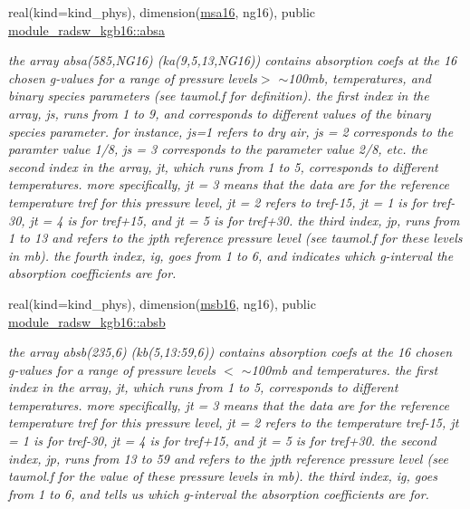 \begin{DoxyCompactItemize}
\mbox{\label{group__module__radsw__kgbnn_ga51fe40b5f24cc461850fe5be40d18869}} 
real(kind=kind\+\_\+phys), dimension(\hyperlink{namespacemodule__radsw__kgb16_ad76a9d79e77228ac93ec3db96eed2b29}{msa16}, ng16), public \hyperlink{group__module__radsw__kgbnn_ga51fe40b5f24cc461850fe5be40d18869}{module\+\_\+radsw\+\_\+kgb16\+::absa}
\begin{DoxyCompactList}\small\item\em the array absa(585,\+N\+G16) (ka(9,5,13,\+N\+G16)) contains absorption coefs at the 16 chosen g-\/values for a range of pressure levels$>$ $\sim$100mb, temperatures, and binary species parameters (see taumol.\+f for definition). the first index in the array, js, runs from 1 to 9, and corresponds to different values of the binary species parameter. for instance, js=1 refers to dry air, js = 2 corresponds to the paramter value 1/8, js = 3 corresponds to the parameter value 2/8, etc. the second index in the array, jt, which runs from 1 to 5, corresponds to different temperatures. more specifically, jt = 3 means that the data are for the reference temperature tref for this pressure level, jt = 2 refers to tref-\/15, jt = 1 is for tref-\/30, jt = 4 is for tref+15, and jt = 5 is for tref+30. the third index, jp, runs from 1 to 13 and refers to the jpth reference pressure level (see taumol.\+f for these levels in mb). the fourth index, ig, goes from 1 to 6, and indicates which g-\/interval the absorption coefficients are for. \end{DoxyCompactList}\item 
\mbox{\label{group__module__radsw__kgbnn_gafe8639128e4f7a48f133b7399addcb79}} 
real(kind=kind\+\_\+phys), dimension(\hyperlink{group__module__radsw__kgbnn_ga2ce1ab36897fb1fc7d85cbf7fe539e59}{msb16}, ng16), public \hyperlink{group__module__radsw__kgbnn_gafe8639128e4f7a48f133b7399addcb79}{module\+\_\+radsw\+\_\+kgb16\+::absb}
\begin{DoxyCompactList}\small\item\em the array absb(235,6) (kb(5,13\+:59,6)) contains absorption coefs at the 16 chosen g-\/values for a range of pressure levels $<$ $\sim$100mb and temperatures. the first index in the array, jt, which runs from 1 to 5, corresponds to different temperatures. more specifically, jt = 3 means that the data are for the reference temperature tref for this pressure level, jt = 2 refers to the temperature tref-\/15, jt = 1 is for tref-\/30, jt = 4 is for tref+15, and jt = 5 is for tref+30. the second index, jp, runs from 13 to 59 and refers to the jpth reference pressure level (see taumol.\+f for the value of these pressure levels in mb). the third index, ig, goes from 1 to 6, and tells us which g-\/interval the absorption coefficients are for. \end{DoxyCompactList}\item 

\end{DoxyCompactItemize}
